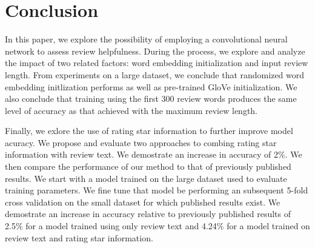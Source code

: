 \documentclass[conference,compsoc]{IEEEtran}
\begin{document}
\section{Conclusion}\label{sec:conclusion}
In this paper, we explore the possibility of employing a convolutional neural network to assess review helpfulness. During the process, we explore and analyze the impact of two related factors: word embedding initialization and input review length. From experiments on a large dataset, we conclude that randomized word embedding initlization performs as well as pre-trained GloVe initialization. We also conclude that training using the first 300 review words produces the same level of accuracy as that achieved with the maximum review length.

Finally, we exlore the use of rating star information to further improve model acuracy. We propose and evaluate two approaches to combing rating star information with review text. We demostrate an increase in accuracy of 2\%. We then compare the performance of our method to that of previously published results. We start with a model trained on the large dataset used to evaluate training parameters. We fine tune that model be performing an subsequent 5-fold cross validation on the small dataset for which published results exist. We demostrate an increase in accuracy relative to previously published results of 2.5\% for a model trained using only review text and 4.24\% for a model trained on review text and rating star information.




%
%



\end{document}
